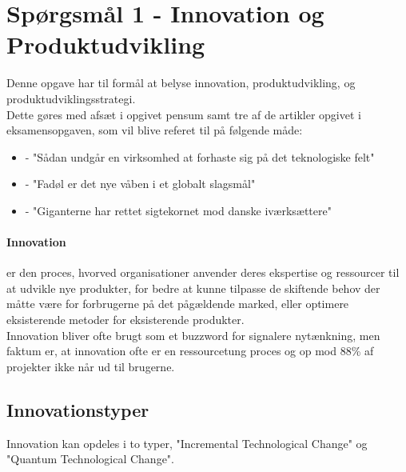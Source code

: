 \section{Spørgsmål 1 - Innovation og Produktudvikling}
Denne opgave har til formål at belyse innovation, produktudvikling, og produktudviklingsstrategi.\\
Dette gøres med afsæt i opgivet pensum samt tre af de artikler opgivet i eksamensopgaven, som vil blive
referet til på følgende måde:\vspace{0.25cm}
\begin{itemize}
    \item \cite[a.1]{eksamensopgave} - "Sådan undgår en virksomhed at forhaste sig på det teknologiske felt"
    \item \cite[a.2]{eksamensopgave} - "Fadøl er det nye våben i et globalt slagsmål"
    \item \cite[a.3]{eksamensopgave} - "Giganterne har rettet sigtekornet mod danske iværksættere"
\end{itemize}
\paragraph{Innovation} er den proces, hvorved organisationer anvender deres ekspertise og
ressourcer til at udvikle nye produkter, for bedre at kunne tilpasse de skiftende
behov der måtte være for forbrugerne på det pågældende marked, eller optimere eksisterende metoder for eksisterende produkter.\\
Innovation bliver ofte brugt som et buzzword for signalere nytænkning, men faktum er, at innovation ofte er en ressourcetung proces og op mod 88\% af projekter ikke når ud til brugerne\cite[s. 388]{jones:2013}.
\subsection{Innovationstyper}
Innovation kan opdeles i to typer, "Incremental Technological Change" og "Quantum Technological Change".
